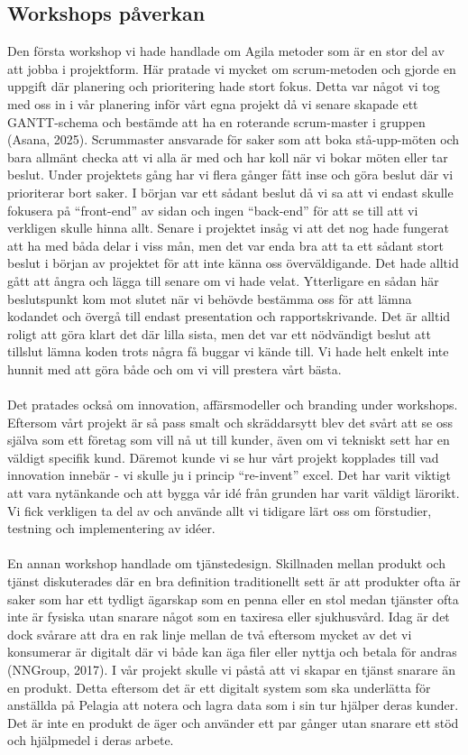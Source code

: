 \subsection{Workshops påverkan}
Den första workshop vi hade handlade om Agila metoder som är en stor del av att jobba i projektform. Här pratade vi mycket om scrum-metoden och gjorde en uppgift där planering och prioritering hade stort fokus. Detta var något vi tog med oss in i vår planering inför vårt egna projekt då vi senare skapade ett GANTT-schema och bestämde att ha en roterande scrum-master i gruppen (Asana, 2025). Scrummaster ansvarade för saker som att boka stå-upp-möten och bara allmänt checka att vi alla är med och har koll när vi bokar möten eller tar beslut. Under projektets gång har vi flera gånger fått inse och göra beslut där vi prioriterar bort saker. I början var ett sådant beslut då vi sa att vi endast skulle fokusera på “front-end” av sidan och ingen “back-end” för att se till att vi verkligen skulle hinna allt. Senare i projektet insåg vi att det nog hade fungerat att ha med båda delar i viss mån, men det var enda bra att ta ett sådant stort beslut i början av projektet för att inte känna oss överväldigande. Det hade alltid gått att ångra och lägga till senare om vi hade velat. Ytterligare en sådan här beslutspunkt kom mot slutet när vi behövde bestämma oss för att lämna kodandet och övergå till endast presentation och rapportskrivande. Det är alltid roligt att göra klart det där lilla sista, men det var ett nödvändigt beslut att tillslut lämna koden trots några få buggar vi kände till. Vi hade helt enkelt inte hunnit med att göra både och om vi vill prestera vårt bästa. 
\\
\\
Det pratades också om innovation, affärsmodeller och branding under workshops. Eftersom vårt projekt är så pass smalt och skräddarsytt blev det svårt att se oss själva som ett företag som vill nå ut till kunder, även om vi tekniskt sett har en väldigt specifik kund. Däremot kunde vi se hur vårt projekt kopplades till vad innovation innebär - vi skulle ju i princip “re-invent” excel. Det har varit viktigt att vara nytänkande och att bygga vår idé från grunden har varit väldigt lärorikt. Vi fick verkligen ta del av och använde allt vi tidigare lärt oss om förstudier, testning och implementering av idéer. 
\\
\\
En annan workshop handlade om tjänstedesign. Skillnaden mellan produkt och tjänst diskuterades där en bra definition traditionellt sett är att produkter ofta är saker som har ett tydligt ägarskap som en penna eller en stol medan tjänster ofta inte är fysiska utan snarare något som en taxiresa eller sjukhusvård. Idag är det dock svårare att dra en rak linje mellan de två eftersom mycket av det vi konsumerar är digitalt där vi både kan äga filer eller nyttja och betala för andras (NNGroup, 2017). I vår projekt skulle vi påstå att vi skapar en tjänst snarare än en produkt. Detta eftersom det är ett digitalt system som ska underlätta för anställda på Pelagia att notera och lagra data som i sin tur hjälper deras kunder. Det är inte en produkt de äger och använder ett par gånger utan snarare ett stöd och hjälpmedel i deras arbete. 

